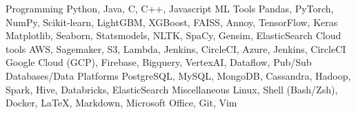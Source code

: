 

\begin{cvskills}
  \cvskill
    {Programming} %
    {Python, Java, C, C++, Javascript}
  \cvskill
    {ML Tools} %
    {Pandas, PyTorch, NumPy, Scikit‑learn, LightGBM, XGBoost, FAISS, Annoy, TensorFlow, Keras} 
 \cvskill
    {} %
    {Matplotlib, Seaborn,  Statsmodels, NLTK, SpaCy, Gensim, ElasticSearch} %
  \cvskill
    {Cloud tools} %
    {AWS, Sagemaker, S3, Lambda, Jenkins, CircleCI, Azure, Jenkins, CircleCI} %
  \cvskill
    {} %
    {Google Cloud (GCP), Firebase, Bigquery, VertexAI,
    Dataflow, Pub/Sub} %
  \cvskill
    {Databases/Data Platforms} %
    {PostgreSQL, MySQL, MongoDB, Cassandra, Hadoop, Spark, Hive, Databricks, ElasticSearch} %
  \cvskill
    {Miscellaneous} %
    {Linux, Shell (Bash/Zsh), Docker, \LaTeX, Markdown, Microsoft Office, Git, Vim} %
\end{cvskills}

